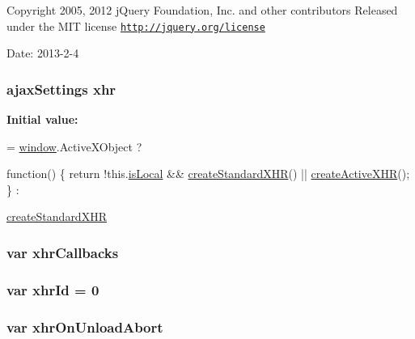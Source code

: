 Copyright 2005, 2012 j\+Query Foundation, Inc. and other contributors Released under the M\+I\+T license \href{http://jquery.org/license}{\tt http\+://jquery.\+org/license}

Date\+: 2013-\/2-\/4 \hypertarget{jquery-1_89_81_8js_a0b7a5cb538ca9913b1b3b1c807ad06f0}{
\subsubsection[{xhr}]{ ajax\+Settings xhr}}\label{jquery-1_89_81_8js_a0b7a5cb538ca9913b1b3b1c807ad06f0}
{\bfseries Initial value\+:}
\begin{DoxyCode}
= \hyperlink{jquery-1_89_81_8js_a04a8a2bbfa9c15500892b8e5033d625b}{window}.ActiveXObject ?
    
    \textcolor{keyword}{function}() \{
        \textcolor{keywordflow}{return} !this.\hyperlink{jquery-ui_8js_a873439a646f430aebbc2851af783caa7}{isLocal} && \hyperlink{jquery-1_89_81_8js_acea019a8b67e4d114deb75d1e0b3474a}{createStandardXHR}() || 
      \hyperlink{jquery-1_89_81_8js_a54bf63f1b5f905292db45a1d6a9dc300}{createActiveXHR}();
    \} :
    
    \hyperlink{jquery-1_89_81_8js_acea019a8b67e4d114deb75d1e0b3474a}{createStandardXHR}
\end{DoxyCode}
\hypertarget{jquery-1_89_81_8js_a068f27a70831ff3a9e0ffa79e063847f}{
\subsubsection[{xhr\+Callbacks}]{\setlength{\rightskip}{0pt plus 5cm}var xhr\+Callbacks}}\label{jquery-1_89_81_8js_a068f27a70831ff3a9e0ffa79e063847f}
\hypertarget{jquery-1_89_81_8js_aa23ed64cf7afc9b028419517bf23fcea}{
\subsubsection[{xhr\+Id}]{\setlength{\rightskip}{0pt plus 5cm}var xhr\+Id = 0}}\label{jquery-1_89_81_8js_aa23ed64cf7afc9b028419517bf23fcea}
\hypertarget{jquery-1_89_81_8js_a271c099ab18ab35c15cac2faa2a097aa}{
\subsubsection[{xhr\+On\+Unload\+Abort}]{\setlength{\rightskip}{0pt plus 5cm}var xhr\+On\+Unload\+Abort}}\label{jquery-1_89_81_8js_a271c099ab18ab35c15cac2faa2a097aa}
